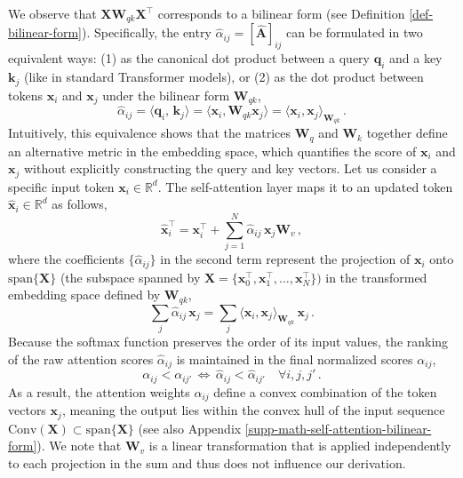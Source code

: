 We observe that $\bm{X} \bm{W}_{qk}\bm{X}^\top$ corresponds to a bilinear form (see Definition \ref{def-bilinear-form}). 
%
Specifically, the entry $\hat{\alpha}_{ij} = [\hat{\bm{A}}]_{ij}$ can be formulated in two equivalent ways: (1) as the canonical dot product between a query $\bm{q}_i$ and a key $\bm{k}_j$  (like in standard Transformer models), or (2) as the dot product between tokens $\bm{x}_i$ and $\bm{x}_j$ under the bilinear form $\bm{W}_{qk}$,
%
\begin{equation}
    \hat{\alpha}_{ij} = \langle \bm{q}_i, \,\bm{k}_j \rangle = \langle \bm{x}_i, \bm{W}_{qk} \bm{x}_j \rangle = \langle \bm{x}_i, \bm{x}_j \rangle_{\bm{W}_{qk}} \,.
\end{equation}
%
Intuitively, this equivalence shows that the matrices $\bm{W}_q$ and $\bm{W}_k$ together define an alternative metric in the embedding space, which quantifies the score of $\bm{x}_i$ and $\bm{x}_j$ without explicitly constructing the query and key vectors.
%
Let us consider a specific input token $\bm{x}_i \in \mathbb{R}^d$. 
%
The self-attention layer maps it to an updated token $\hat{\bm{x}}_i \in \mathbb{R}^d$ as follows,
%
\begin{equation}
    \hat{\bm{x}}^\top_i = \bm{x}^\top_i + \sum_{j= 1}^N  \hat{\alpha}_{ij}\,\bm{x}_j\bm{W}_v \,,
\label{eq-prop-self-attention-bilinear-form}
\end{equation}
%
where the coefficients $\{\hat{\alpha}_{ij}\}$ in the second term represent the projection of $\bm{x}_i$ onto $\text{span}\{\bm{X}\}$ (the subspace spanned by $\bm{X} = \{\bm{x}_0^\top, \bm{x}_1^\top, \dots, \bm{x}_N^\top\})$ in the transformed embedding space defined by $\bm{W}_{qk}$,
%
\begin{equation}
    \sum_j\hat{\alpha}_{ij}\, \bm{x}_j =  \sum_j \langle \bm{x}_i, \bm{x}_j \rangle_{\bm{W}_{qk}} \,\bm{x}_j \,.
\label{eq-proof-self-attention-bilinear-form}
\end{equation}
%
Because the softmax function preserves the order of its input values, the ranking of the raw attention scores $\hat{\alpha}_{ij}$ is maintained in the final normalized scores $\alpha_{ij}$,
%
\begin{equation}
     \alpha_{ij} < \alpha_{ij'} \,  \Leftrightarrow \,\hat{\alpha}_{ij} < \hat{\alpha}_{ij'}\quad \forall i,j, j' \,.
\end{equation}
%
As a result, the attention weights ${\alpha_{ij}}$ define a convex combination of the token vectors ${\bm{x}_j}$, meaning the output lies within the convex hull of the input sequence $\text{Conv}(\bm{X}) \subset \text{span}\{\bm{X}\}$ (see also Appendix \ref{supp-math-self-attention-bilinear-form}).
%
We note that $\bm{W}_v$ is a linear transformation that is applied independently to each projection in the sum and thus does not influence our derivation.

